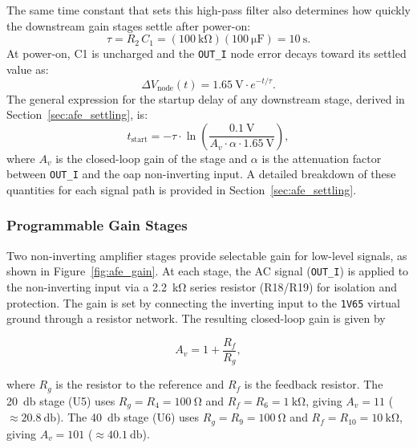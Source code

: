 The same time constant that sets this high-pass filter also determines how quickly the downstream gain stages settle after power-on:
\begin{equation}
  \tau = R_2\,C_1 = (\SI{100}{\kilo\ohm})(\SI{100}{\micro\farad}) = \SI{10}{\second}.
  \label{eq:tau_c1}
\end{equation}
At power-on, C1 is uncharged and the \texttt{OUT\_I} node error decays toward its settled value as:
\begin{equation}
  \Delta V_{\text{node}}(t) = \SI{1.65}{\volt}\cdot e^{-t/\tau}.
  \label{eq:dvnode}
\end{equation}
The general expression for the startup delay of any downstream stage, derived in Section~\ref{sec:afe_settling}, is:
\begin{equation}
  t_{\text{start}} = -\tau \cdot \ln\!\left(\frac{\SI{0.1}{\volt}}{A_v \cdot \alpha \cdot \SI{1.65}{\volt}}\right),
  \label{eq:t_start}
\end{equation}
where $A_v$ is the closed-loop gain of the stage and $\alpha$ is the attenuation factor between \texttt{OUT\_I} and the \acrshort{oap} non-inverting input. A detailed breakdown of these quantities for each signal path is provided in Section~\ref{sec:afe_settling}.

\subsubsection{Programmable Gain Stages}
\label{sec:gain}
Two non-inverting amplifier stages provide selectable gain for low-level signals, as shown in Figure~\ref{fig:afe_gain}. At each stage, the AC signal (\texttt{OUT\_I}) is applied to the non-inverting input via a \SI{2.2}{\kilo\ohm} series resistor (R18/R19) for isolation and protection. The gain is set by connecting the inverting input to the \texttt{1V65} virtual ground through a resistor network. The resulting closed-loop gain is given by

\begin{equation}
  A_v = 1 + \frac{R_f}{R_g},
  \label{eq:afe_gain}
\end{equation}

where $R_g$ is the resistor to the reference and $R_f$ is the feedback resistor. The \SI{20}{\decibel} stage (U5) uses $R_g = R_4 = \SI{100}{\ohm}$ and $R_f = R_6 = \SI{1}{\kilo\ohm}$, giving $A_v = 11$ ($\approx \SI{20.8}{\decibel}$). The \SI{40}{\decibel} stage (U6) uses $R_g = R_9 = \SI{100}{\ohm}$ and $R_f = R_{10} = \SI{10}{\kilo\ohm}$, giving $A_v = 101$ ($\approx \SI{40.1}{\decibel}$).

